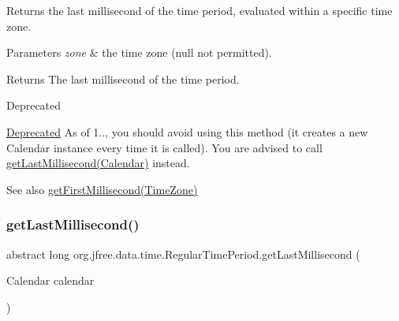 Returns the last millisecond of the time period, evaluated within a specific time zone.


\begin{DoxyParams}{Parameters}
{\em zone} & the time zone ({\ttfamily null} not permitted).\\
\hline
\end{DoxyParams}
\begin{DoxyReturn}{Returns}
The last millisecond of the time period.
\end{DoxyReturn}
\begin{DoxyRefDesc}{Deprecated}
\item[\mbox{\hyperlink{deprecated__deprecated000274}{Deprecated}}]As of 1.., you should avoid using this method (it creates a new Calendar instance every time it is called). You are advised to call \mbox{\hyperlink{classorg_1_1jfree_1_1data_1_1time_1_1_regular_time_period_a5e5b6c8eec369a8e1461021b3fa602ce}{get\+Last\+Millisecond(\+Calendar)}} instead.\end{DoxyRefDesc}


\begin{DoxySeeAlso}{See also}
\mbox{\hyperlink{classorg_1_1jfree_1_1data_1_1time_1_1_regular_time_period_a2e46e03754784f461b73ceb910a36afa}{get\+First\+Millisecond(\+Time\+Zone)}} 
\end{DoxySeeAlso}
\mbox{\label{classorg_1_1jfree_1_1data_1_1time_1_1_regular_time_period_a5e5b6c8eec369a8e1461021b3fa602ce}} 
\subsubsection{\texorpdfstring{get\+Last\+Millisecond()}{getLastMillisecond()}\hspace{0.1cm}{\footnotesize\ttfamily [3/3]}}
{\footnotesize\ttfamily abstract long org.\+jfree.\+data.\+time.\+Regular\+Time\+Period.\+get\+Last\+Millisecond (\begin{DoxyParamCaption}\item[{Calendar}]{calendar }\end{DoxyParamCaption})\hspace{0.3cm}{\ttfamily [abstract]}}

